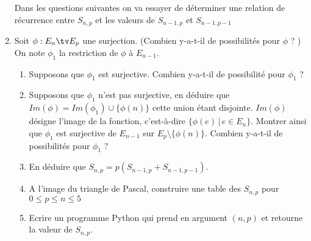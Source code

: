 \documentclass[a4paper, 11pt,reqno]{article}
\begin{document}
\begin{exercice}
\begin{enumerate}
Dans les questions suivantes on va essayer de déterminer une relation de récurrence entre $S_{n,p}$ et les valeurs de $S_{n-1,p}$ et $S_{n-1,p-1}$
\item Soit $\phi : E_n \tv E_p$  une surjection. (Combien y-a-t-il de possibilités pour $\phi$ ? ) On note $\phi_1$ la restriction de $\phi$ à $E_{n-1}$. 
\begin{enumerate}
\item Supposons que $\phi_1$ est surjective. Combien y-a-t-il de possibilité pour $\phi_1$ ? 
\item Supposons que $\phi_1$ n'est pas surjective, en déduire que $Im(\phi) = Im(\phi_1) \cup \{ \phi(n)\}$ cette union étant disjointe. $Im(\phi)$ désigne l'image  de la fonction, c'est-à-dire $\{ \phi(e) \, |\, e\in E_n\}$. Montrer ainsi que $\phi_1$ est surjective de $E_{n-1}$ sur $E_p\setminus\{ \phi(n)\}$. Combien y-a-t-il de possibilités pour $\phi_1$ ?
\item En déduire que $S_{n,p}= p(S_{n-1,p} +S_{n-1,p-1})$.
\item A l'image du triangle de Pascal, construire une table des $S_{n,p}$ pour $0\leq p\leq n \leq 5$
\item Ecrire un programme Python qui prend en argument $(n,p)$ et retourne la valeur de $S_{n,p}$.
\end{enumerate}

\end{enumerate}
\end{exercice}
\end{document}
